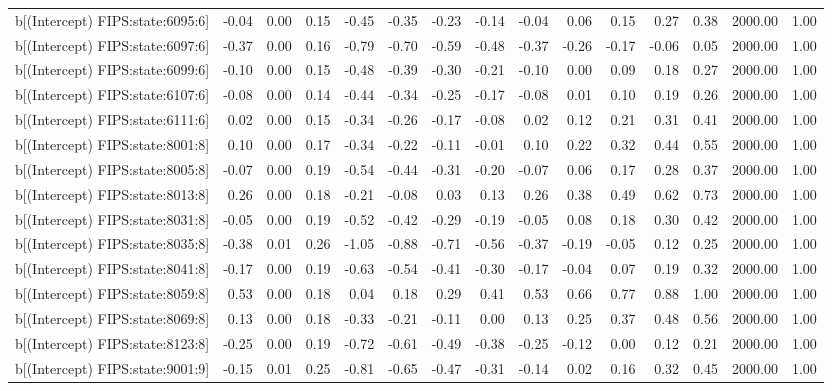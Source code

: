 \begin{table}[ht]
\begin{tabular}{rrrrrrrrrrrrrrr}
  b[(Intercept) FIPS:state:6095:6] & -0.04 & 0.00 & 0.15 & -0.45 & -0.35 & -0.23 & -0.14 & -0.04 & 0.06 & 0.15 & 0.27 & 0.38 & 2000.00 & 1.00 \\ 
  b[(Intercept) FIPS:state:6097:6] & -0.37 & 0.00 & 0.16 & -0.79 & -0.70 & -0.59 & -0.48 & -0.37 & -0.26 & -0.17 & -0.06 & 0.05 & 2000.00 & 1.00 \\ 
  b[(Intercept) FIPS:state:6099:6] & -0.10 & 0.00 & 0.15 & -0.48 & -0.39 & -0.30 & -0.21 & -0.10 & 0.00 & 0.09 & 0.18 & 0.27 & 2000.00 & 1.00 \\ 
  b[(Intercept) FIPS:state:6107:6] & -0.08 & 0.00 & 0.14 & -0.44 & -0.34 & -0.25 & -0.17 & -0.08 & 0.01 & 0.10 & 0.19 & 0.26 & 2000.00 & 1.00 \\ 
  b[(Intercept) FIPS:state:6111:6] & 0.02 & 0.00 & 0.15 & -0.34 & -0.26 & -0.17 & -0.08 & 0.02 & 0.12 & 0.21 & 0.31 & 0.41 & 2000.00 & 1.00 \\ 
  b[(Intercept) FIPS:state:8001:8] & 0.10 & 0.00 & 0.17 & -0.34 & -0.22 & -0.11 & -0.01 & 0.10 & 0.22 & 0.32 & 0.44 & 0.55 & 2000.00 & 1.00 \\ 
  b[(Intercept) FIPS:state:8005:8] & -0.07 & 0.00 & 0.19 & -0.54 & -0.44 & -0.31 & -0.20 & -0.07 & 0.06 & 0.17 & 0.28 & 0.37 & 2000.00 & 1.00 \\ 
  b[(Intercept) FIPS:state:8013:8] & 0.26 & 0.00 & 0.18 & -0.21 & -0.08 & 0.03 & 0.13 & 0.26 & 0.38 & 0.49 & 0.62 & 0.73 & 2000.00 & 1.00 \\ 
  b[(Intercept) FIPS:state:8031:8] & -0.05 & 0.00 & 0.19 & -0.52 & -0.42 & -0.29 & -0.19 & -0.05 & 0.08 & 0.18 & 0.30 & 0.42 & 2000.00 & 1.00 \\ 
  b[(Intercept) FIPS:state:8035:8] & -0.38 & 0.01 & 0.26 & -1.05 & -0.88 & -0.71 & -0.56 & -0.37 & -0.19 & -0.05 & 0.12 & 0.25 & 2000.00 & 1.00 \\ 
  b[(Intercept) FIPS:state:8041:8] & -0.17 & 0.00 & 0.19 & -0.63 & -0.54 & -0.41 & -0.30 & -0.17 & -0.04 & 0.07 & 0.19 & 0.32 & 2000.00 & 1.00 \\ 
  b[(Intercept) FIPS:state:8059:8] & 0.53 & 0.00 & 0.18 & 0.04 & 0.18 & 0.29 & 0.41 & 0.53 & 0.66 & 0.77 & 0.88 & 1.00 & 2000.00 & 1.00 \\ 
  b[(Intercept) FIPS:state:8069:8] & 0.13 & 0.00 & 0.18 & -0.33 & -0.21 & -0.11 & 0.00 & 0.13 & 0.25 & 0.37 & 0.48 & 0.56 & 2000.00 & 1.00 \\ 
  b[(Intercept) FIPS:state:8123:8] & -0.25 & 0.00 & 0.19 & -0.72 & -0.61 & -0.49 & -0.38 & -0.25 & -0.12 & 0.00 & 0.12 & 0.21 & 2000.00 & 1.00 \\ 
  b[(Intercept) FIPS:state:9001:9] & -0.15 & 0.01 & 0.25 & -0.81 & -0.65 & -0.47 & -0.31 & -0.14 & 0.02 & 0.16 & 0.32 & 0.45 & 2000.00 & 1.00 \\ 

\end{tabular}
\end{table}
